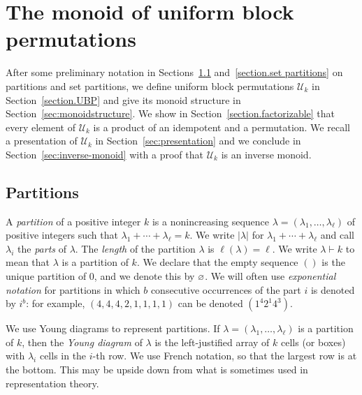 \documentclass[ALCO,Unicode]{cedram}
\newcommand{\defncolor}{\color{darkred}}
\newcommand{\defn}[1]{{\defncolor\emph{#1}}} %
\newcommand{\epart}{\text{\footnotesize$\varnothing$}}
\begin{document}




\section{The monoid of uniform block permutations}
\label{section.monoid}

After some preliminary notation in Sections~\ref{section.partitions} and~\ref{section.set partitions} on partitions and set partitions,
we define uniform block permutations $\mathcal{U}_k$ in Section~\ref{section.UBP} and give its monoid structure in Section~\ref{sec:monoidstructure}. 
We show in Section~\ref{section.factorizable} that every element of $\mathcal{U}_k$ is a product of an idempotent and a permutation. We recall a 
presentation of $\mathcal{U}_k$ in Section~\ref{sec:presentation} and we conclude in Section~\ref{sec:inverse-monoid} with a proof that $\mathcal{U}_k$ 
is an inverse monoid.

\subsection{Partitions}
\label{section.partitions}
A \defn{partition} of a positive integer $k$ is a nonincreasing sequence $\lambda = (\lambda_1, \ldots, \lambda_\ell)$ of positive integers such that 
$\lambda_1 + \cdots + \lambda_\ell = k$.
We write $|\lambda|$ for $\lambda_1 + \cdots + \lambda_\ell$ and call $\lambda_i$ the \defn{parts} of $\lambda$.
The \defn{length} of the partition $\lambda$ is $\ell(\lambda)=\ell$.
We write $\lambda \vdash k$ to mean that $\lambda$ is a partition of $k$.
We declare that the empty sequence $()$ is the unique partition of $0$, and we denote this by $\epart$.
We will often use \defn{exponential notation} for partitions in which $b$ consecutive occurrences of the part $i$ is denoted by $i^b$: 
for example, $(4,4,4,2,1,1,1,1)$ can be denoted $(1^4 2^1 4^3)$.

We use Young diagrams to represent partitions.  If $\lambda = (\lambda_1, \ldots, \lambda_\ell)$ is a partition of $k$, then the \defn{Young diagram}
of $\lambda$ is the left-justified array of $k$ cells (or boxes) with $\lambda_i$ cells in the $i$-th row. We use French notation, so that
the largest row is at the bottom. This may be upside down from what is sometimes used in representation theory.
\end{document}

